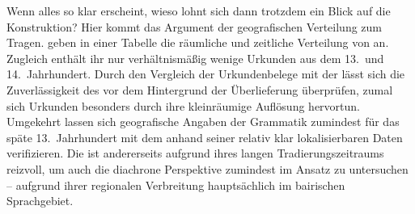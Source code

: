Wenn alles so klar erscheint, wieso lohnt sich dann trotzdem ein Blick auf die
Konstruktion? Hier kommt das Argument der geografischen
Verteilung zum Tragen. \citet[627]{ksw2} geben in
einer Tabelle die räumliche und
zeitliche Verteilung von  an. Zugleich
enthält ihr  nur verhältnismäßig wenige Urkunden aus dem 13.\ und
14.\ Jahrhundert. Durch den Vergleich der Urkundenbelege mit der
 lässt sich die
Zuverlässigkeit des \CAO{} vor dem Hintergrund der Überlieferung überprüfen,
zumal sich Urkunden besonders durch ihre kleinräumige Auflösung hervortun.
Umgekehrt lassen sich geografische Angaben der Grammatik
zumindest für das späte 13.~Jahrhundert mit dem \CAO{} anhand seiner relativ
klar lokalisierbaren Daten verifizieren. Die \KC{} ist andererseits aufgrund
ihres langen Tradierungs\-zeitraums reizvoll, um auch die
diachrone Perspektive zumindest im Ansatz zu untersuchen --
aufgrund ihrer regionalen Verbreitung hauptsächlich im bairischen
Sprachgebiet.

